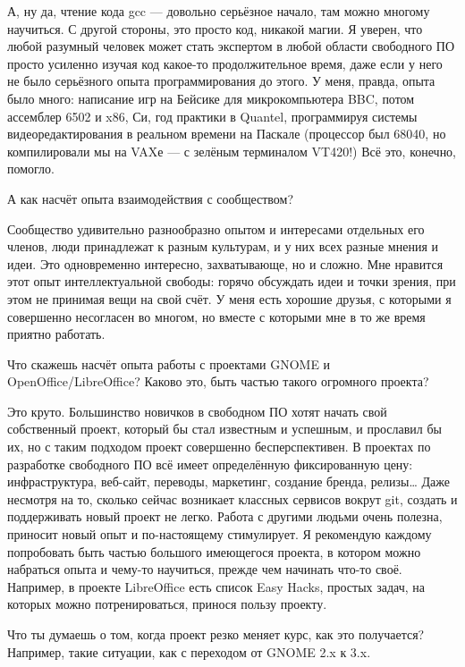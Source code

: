 \documentclass[10pt, a5paper]{article}
\begin{document}
\begin{Parallel}[p]{}{}
{\a А, ну да, чтение кода gcc — довольно серьёзное начало, там можно многому научиться. С другой стороны, это просто код, никакой магии. Я уверен, что любой разумный человек может стать экспертом в любой области свободного ПО просто усиленно изучая код какое-то продолжительное время, даже если у него не было серьёзного опыта программирования до этого. У меня, правда, опыта было много: написание игр на Бейсике для микрокомпьютера BBC, потом ассемблер 6502 и x86, Си, год практики в Quantel, программируя системы видеоредактирования в реальном времени на Паскале (процессор был 68040, но компилировали мы на VAXе — с зелёным терминалом VT420!) Всё это, конечно, помогло.

\q А как насчёт опыта взаимодействия с сообществом?

\a Сообщество удивительно разнообразно опытом и интересами отдельных его членов, люди принадлежат к разным культурам, и у них всех разные мнения и идеи. Это одновременно интересно, захватывающе, но и сложно. Мне нравится этот опыт интеллектуальной свободы: горячо обсуждать идеи и точки зрения, при этом не принимая вещи на свой счёт. У меня есть хорошие друзья, с которыми я совершенно несогласен во многом, но вместе с которыми мне в то же время приятно работать.

\q Что скажешь насчёт опыта работы с проектами GNOME и OpenOffice/LibreOffice? Каково это, быть частью такого огромного проекта?

\a Это круто. Большинство новичков в свободном ПО хотят начать свой собственный проект, который бы стал известным и успешным, и прославил бы их, но с таким подходом проект совершенно бесперспективен. В проектах по разработке свободного ПО всё имеет определённую фиксированную цену: инфраструктура, веб-сайт, переводы, маркетинг, создание бренда, релизы… Даже несмотря на то, сколько сейчас возникает классных сервисов вокрут git, создать и поддерживать новый проект не легко. Работа с другими людьми очень полезна, приносит новый опыт и по-настоящему стимулирует. Я рекомендую каждому попробовать быть частью большого имеющегося проекта, в котором можно набраться опыта и чему-то научиться, прежде чем начинать что-то своё. Например, в проекте LibreOffice есть список Easy Hacks, простых задач, на которых можно потренироваться, принося пользу проекту.

\q Что ты думаешь о том, когда проект резко меняет курс, как это получается? Например, такие ситуации, как с переходом от GNOME 2.x к 3.x.

}
\end{Parallel}
\end{document}
